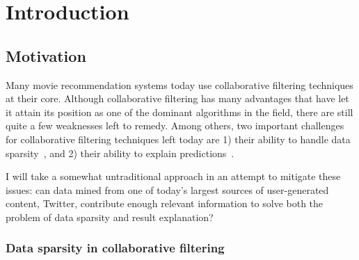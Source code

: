 
\chapter{Introduction} %

\label{Chapter1} %




\section{Motivation}

% 

Many movie recommendation systems today use collaborative filtering techniques at their core. Although collaborative filtering has many advantages that have let it attain its position as one of the dominant algorithms in the field, there are still quite a few weaknesses left to remedy. Among others, two important challenges for collaborative filtering techniques left today are 1) their ability to handle data sparsity~\cite{Su:2009:SCF:1592474.1722966}, and 2) their ability to explain predictions~\cite{Herlocker:2000:ECF:358916.358995}.

I will take a somewhat untraditional approach in an attempt to mitigate these issues: can data mined from one of today's largest sources of user-generated content, Twitter, contribute enough relevant information to solve both the problem of data sparsity and result explanation?

\subsection{Data sparsity in collaborative filtering}

